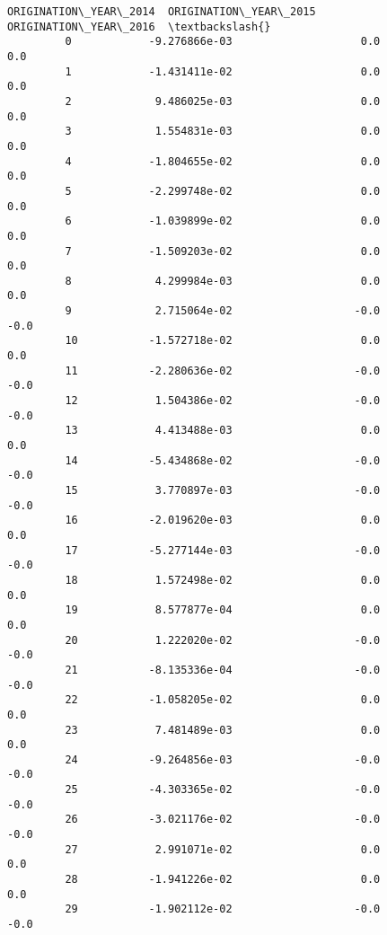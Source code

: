 \documentclass[11pt]{article}
\begin{document}
\begin{Verbatim}[commandchars=\\\{\}]
              ORIGINATION\_YEAR\_2014  ORIGINATION\_YEAR\_2015  ORIGINATION\_YEAR\_2016  \textbackslash{}
         0            -9.276866e-03                    0.0                    0.0   
         1            -1.431411e-02                    0.0                    0.0   
         2             9.486025e-03                    0.0                    0.0   
         3             1.554831e-03                    0.0                    0.0   
         4            -1.804655e-02                    0.0                    0.0   
         5            -2.299748e-02                    0.0                    0.0   
         6            -1.039899e-02                    0.0                    0.0   
         7            -1.509203e-02                    0.0                    0.0   
         8             4.299984e-03                    0.0                    0.0   
         9             2.715064e-02                   -0.0                   -0.0   
         10           -1.572718e-02                    0.0                    0.0   
         11           -2.280636e-02                   -0.0                   -0.0   
         12            1.504386e-02                   -0.0                   -0.0   
         13            4.413488e-03                    0.0                    0.0   
         14           -5.434868e-02                   -0.0                   -0.0   
         15            3.770897e-03                   -0.0                   -0.0   
         16           -2.019620e-03                    0.0                    0.0   
         17           -5.277144e-03                   -0.0                   -0.0   
         18            1.572498e-02                    0.0                    0.0   
         19            8.577877e-04                    0.0                    0.0   
         20            1.222020e-02                   -0.0                   -0.0   
         21           -8.135336e-04                   -0.0                   -0.0   
         22           -1.058205e-02                    0.0                    0.0   
         23            7.481489e-03                    0.0                    0.0   
         24           -9.264856e-03                   -0.0                   -0.0   
         25           -4.303365e-02                   -0.0                   -0.0   
         26           -3.021176e-02                   -0.0                   -0.0   
         27            2.991071e-02                    0.0                    0.0   
         28           -1.941226e-02                    0.0                    0.0   
         29           -1.902112e-02                   -0.0                   -0.0   

\end{Verbatim}
\end{document}
